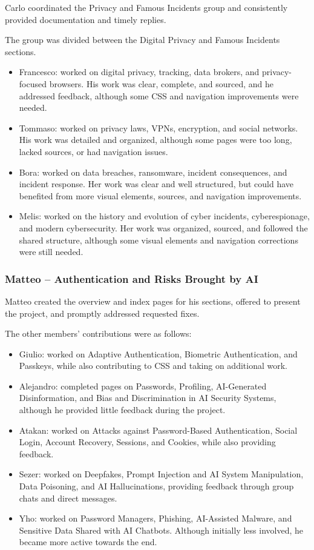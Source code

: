 Carlo coordinated the Privacy and Famous Incidents group and consistently provided documentation and timely replies.

The group was divided between the Digital Privacy and Famous Incidents sections.

\begin{itemize}
    \item Francesco: worked on digital privacy, tracking, data brokers, and privacy-focused browsers. His work was clear, complete, and sourced, and he addressed feedback, although some CSS and navigation improvements were needed.
    \item Tommaso: worked on privacy laws, VPNs, encryption, and social networks. His work was detailed and organized, although some pages were too long, lacked sources, or had navigation issues.
    \item Bora: worked on data breaches, ransomware, incident consequences, and incident response. Her work was clear and well structured, but could have benefited from more visual elements, sources, and navigation improvements.
    \item Melis: worked on the history and evolution of cyber incidents, cyberespionage, and modern cybersecurity. Her work was organized, sourced, and followed the shared structure, although some visual elements and navigation corrections were still needed.
\end{itemize}

\subsubsection{Matteo -- Authentication and Risks Brought by AI}
\label{sec:matteo}

Matteo created the overview and index pages for his sections,
offered to present the project, and promptly addressed requested fixes.

The other members' contributions were as follows:

\begin{itemize}
    \item Giulio: worked on Adaptive Authentication, Biometric Authentication, and Passkeys, while also contributing to CSS and taking on additional work.
    \item Alejandro: completed pages on Passwords, Profiling, AI-Generated Disinformation, and Bias and Discrimination in AI Security Systems, although he provided little feedback during the project.
    \item Atakan: worked on Attacks against Password-Based Authentication, Social Login, Account Recovery, Sessions, and Cookies, while also providing feedback.
    \item Sezer: worked on Deepfakes, Prompt Injection and AI System Manipulation, Data Poisoning, and AI Hallucinations, providing feedback through group chats and direct messages.
    \item Yho: worked on Password Managers, Phishing, AI-Assisted Malware, and Sensitive Data Shared with AI Chatbots. Although initially less involved, he became more active towards the end.
\end{itemize}

